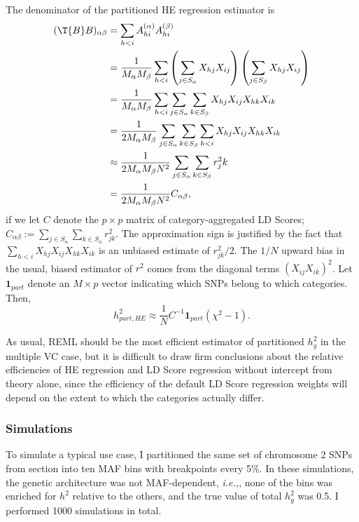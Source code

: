 The denominator of the partitioned HE regression estimator is 
\begin{align}
	(\T{B}B)_{\alpha\beta} 
&= 
	\sum_{h<i}
		 A^{(\alpha)}_{hi}A^{(\beta)}_{hi}\nonumber\\
&= 
	\frac{1}{M_\alpha M_\beta}\sum_{h<i}
		\left(\sum_{j\in S_\alpha} X_{hj}X_{ij} \right)
		\left(\sum_{j\in S_\beta} X_{hj}X_{ij} \right) \nonumber\\
&= 
	\frac{1}{M_\alpha M_\beta}\sum_{h<i}
		\sum_{j\in S_\alpha} 
			\sum_{k\in S_\beta} 
				X_{hj}X_{ij} X_{hk}X_{ik} \nonumber\\
&= 
	\frac{1}{2M_\alpha M_\beta}\sum_{j\in S_\alpha} 
		\sum_{k\in S_\beta} 
			\sum_{h<i}			
				X_{hj}X_{ij} X_{hk}X_{ik}\nonumber \\
&\approx
	\frac{1}{2M_\alpha M_\beta N^2}\sum_{j\in S_\alpha} 
		\sum_{k\in S_\beta} 
			r^2_jk \nonumber\\
&=  
	\frac{1}{2M_\alpha M_\beta N^2} C_{\alpha\beta},
\end{align}
 if we let $C$ denote the $p\times p$ matrix of category-aggregated LD Scores; $C_{\alpha\beta}:= \sum_{j\in S_\alpha}\sum_{k \in S_\alpha} r^2_{jk}$.
The approximation sign is justified by the fact that $\sum_{h<i} X_{hj}X_{ij} X_{hk}X_{ik}$ is an unbiased estimate of $r^2_{jk}/2$.
The $1/N$ upward bias in the usual, biased estimator of $r^2$ comes from the diagonal terms $(X_{ij}X_{ik})^2$.
Let $\mathbf{1}_{part}$ denote an $M\times p$ vector indicating which SNPs belong to which categories.
Then,
\begin{equation}
	h^2_{part,HE} \approx \dfrac{1}{N}C^{-1}\mathbf{1}_{part}(\chi^2-1).
\end{equation}

As usual, REML should be the most efficient estimator of partitioned $h^2_g$ in the multiple VC case,
but it is difficult to draw firm conclusions about the relative efficiencies of HE regression and LD Score regression without
intercept from theory alone, since the efficiency of the default LD Score regression weights will depend on the extent to which the 
categories actually differ.

\subsubsection{Simulations}
 
To simulate a typical use case, I partitioned the same set of chromosome 2 SNPs from section \label{h2:sims}
into ten MAF bins with breakpoints every 5\%.
In these simulations, the genetic architecture was not MAF-dependent, \emph{i.e.,}, none of the bins was enriched for $h^2$ 
relative to the others, and the true value of total $h^2_g$ was 0.5. I performed 1000 simulations in total.
 
